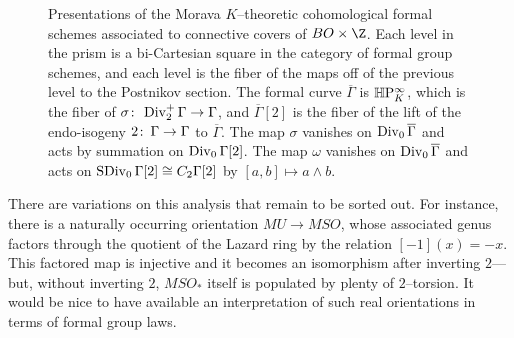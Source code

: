 \begin{figure}
\begin{center}
\end{center}
\caption{Presentations of the Morava $K$--theoretic cohomological formal schemes associated to connective covers of $BO \times \Z$.  Each level in the prism is a bi-Cartesian square in the category of formal group schemes, and each level is the fiber of the maps off of the previous level to the Postnikov section.  The formal curve $\overline \Gamma$ is $\mathbb H\mathrm P^\infty_K$, which is the fiber of $\sigma\colon\thinspace \operatorname{Div}_2^+ \Gamma \to \Gamma$, and $\overline \Gamma[2]$ is the fiber of the lift of the endo-isogeny $2\colon\thinspace \Gamma \to \Gamma$ to $\overline \Gamma$.  The map $\sigma$ vanishes on $\operatorname{Div}_0 \overline \Gamma$ and acts by summation on $\operatorname{Div}_0 \Gamma[2]$.  The map $\omega$ vanishes on $\operatorname{Div}_0 \overline \Gamma$ and acts on $\operatorname{SDiv}_0 \Gamma[2] \cong C_2 \Gamma[2]$ by $[a, b] \mapsto a \wedge b$.}\label{MoravaKthyOfBO}
\end{figure}

\begin{remark}
There are variations on this analysis that remain to be sorted out.  For instance, there is a naturally occurring orientation $MU \to MSO$, whose associated genus factors through the quotient of the Lazard ring by the relation $[-1](x) = -x$.  This factored map is injective and it becomes an isomorphism after inverting $2$---but, without inverting $2$, $MSO_*$ itself is populated by plenty of $2$--torsion.  It would be nice to have available an interpretation of such real orientations in terms of formal group laws.
\end{remark}

